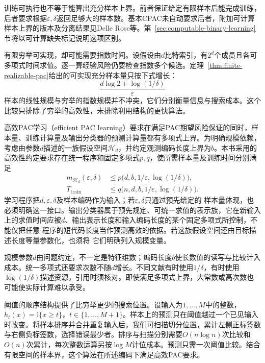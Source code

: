 训练可执行也不等于能算出充分样本上界。前者保证给定有限样本后能完成训练，后者要求根据$\varepsilon,\delta$返回足够大的样本数。基本CPAC未自动要求后者，附加可计算样本上界的版本及分离结果见Delle Rose等。第~\ref{sec:computable-binary-learning}节将以可计算缺失标记说明这项区别。

有限穷举可实现，却可能需要指数时间。设假设由$d$比特索引，有$2^d$个成员且各可多项式时间求值。逐一算经验风险仍要检查指数多个候选。定理~\ref{thm:finite-realizable-pac}给出的可实现充分样本量只按下式增长：
\[
 \frac{d\log2+\log(1/\delta)}{\varepsilon}
\]
样本的线性规模与穷举的指数规模并不冲突，它们分别衡量信息与搜索成本。这个比较只排除了穷举的高效性，未排除利用结构的更快算法。

\begin{definition}[高效PAC学习]
\label{def:efficient-pac-learning}
高效PAC学习（efficient PAC learning）要求在满足PAC期望风险保证的同时，样本量、训练计算量及输出分类器的预测计算量都有多项式上界。为明确规模依赖，考虑由参数$d$描述的一族假设空间$\mathcal H_d$，并约定观测编码长度上界为$b$。本书采用的高效性约定要求存在统一程序和固定多项式$p,q$，使所需样本量及训练时间分别满足
\begin{equation}
 \begin{aligned}
 m_{\mathcal H_d}(\varepsilon,\delta)
 &\leq p\bigl(d,b,1/\varepsilon,\log(1/\delta)\bigr),\\
 T_{\mathrm{train}}
 &\leq q\bigl(n,d,b,1/\varepsilon,\log(1/\delta)\bigr).
 \end{aligned}
 \label{eq:efficient-pac-resources}
\end{equation}
学习程序把$d,\varepsilon,\delta$及样本编码作为输入；若$\varepsilon,\delta$只通过预先给定的
样本量体现，也必须明确这一接口。输出分类器属于预先规定、可统一求值的表示族，它在新输入
上的求值时间应被$d$、输出表示长度和输入编码长度的某个固定多项式所控制，不能仅把任意
程序的短代码长度当作预测高效的依据。若这族假设空间还由目标描述长度等量参数化，也须将
它们明确列入规模变量。
\end{definition}

规模参数$d$由问题约定，不一定是特征维数；编码长度$b$使长数值的读写与比较计入成本。统一多项式还要求次数不随$d$增长。不同文献有时使用$1/\delta$，有时使用$\log(1/\delta)$描述资源，引用时须核对。即使满足多项式上界，大常数或高次数也可能使实际计算难以承受。

阈值的顺序结构提供了比穷举更少的搜索位置。设输入为$1,\ldots,M$中的整数，$h_t(x)=\mathbb I\{x\geq t\}$，$t\in\{1,\ldots,M+1\}$。样本上的预测只在阈值越过一个已见输入时改变。将样本排序并合并重复输入后，我们可扫描切分位置，累计左侧正标签数与右侧负标签数，选择错误最少者。排序与扫描分别需要$O(n\log n)$次比较和$O(n)$次累计，每次整数运算另按$\log M$计位成本。预测只需一次阈值比较。结合有限空间的样本界，这个算法在所述编码下满足高效PAC要求。

